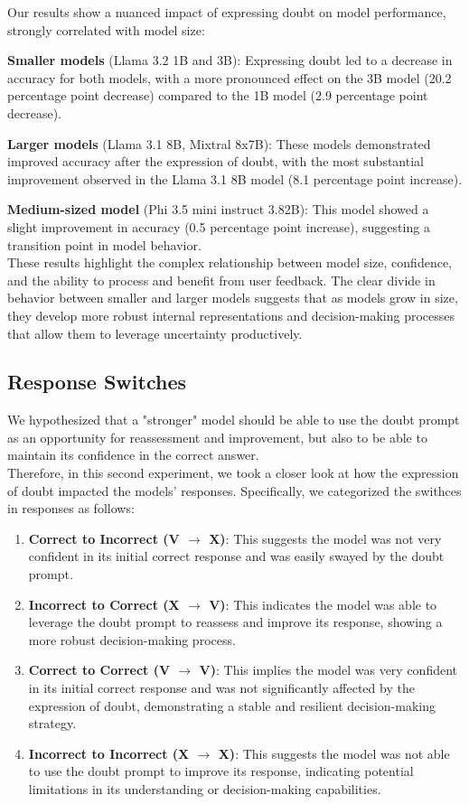Our results show a nuanced impact of expressing doubt on model performance, strongly correlated with model size:

\textbf{Smaller models} (Llama 3.2 1B and 3B): Expressing doubt led to a decrease in accuracy for both models, with a more pronounced effect on the 3B model (20.2 percentage point decrease) compared to the 1B model (2.9 percentage point decrease).

\textbf{Larger models} (Llama 3.1 8B, Mixtral 8x7B): These models demonstrated improved accuracy after the expression of doubt, with the most substantial improvement observed in the Llama 3.1 8B model (8.1 percentage point increase).

\textbf{Medium-sized model} (Phi 3.5 mini instruct 3.82B): This model showed a slight improvement in accuracy (0.5 percentage point increase), suggesting a transition point in model behavior. \\

These results highlight the complex relationship between model size, confidence, and the ability to process and benefit from user feedback. The clear divide in behavior between smaller and larger models suggests that as models grow in size, they develop more robust internal representations and decision-making processes that allow them to leverage uncertainty productively.

\subsection{Response Switches}

We hypothesized that a "stronger" model should be able to use the doubt prompt as an opportunity for reassessment and improvement, but also to be able to maintain its confidence in the correct answer. \\
Therefore, in this second experiment, we took a closer look at how the expression of doubt impacted the models' responses. Specifically, we categorized the swithces in responses as follows:
\begin{enumerate}[noitemsep, topsep=2pt]
  \item \textbf{Correct to Incorrect (V $\rightarrow$ X)}: This suggests the model was not very confident in its initial correct response and was easily swayed by the doubt prompt.
  \item \textbf{Incorrect to Correct (X $\rightarrow$ V)}: This indicates the model was able to leverage the doubt prompt to reassess and improve its response, showing a more robust decision-making process.
  \item \textbf{Correct to Correct (V $\rightarrow$ V)}:  This implies the model was very confident in its initial correct response and was not significantly affected by the expression of doubt, demonstrating a stable and resilient decision-making strategy.
  \item \textbf{Incorrect to Incorrect (X $\rightarrow$ X)}: This suggests the model was not able to use the doubt prompt to improve its response, indicating potential limitations in its understanding or decision-making capabilities.
\end{enumerate}

